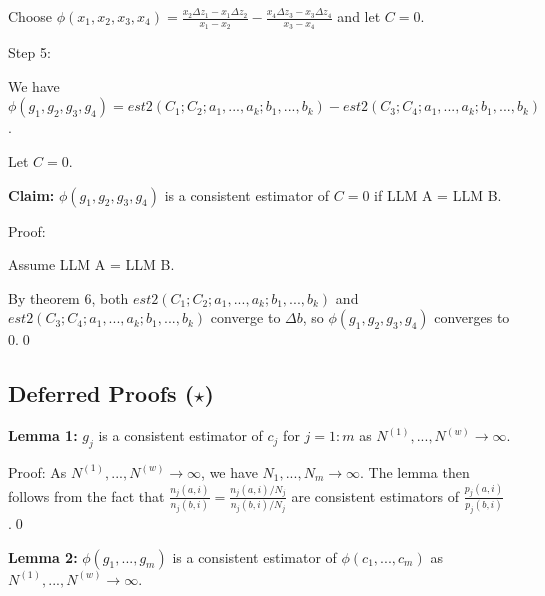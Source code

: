 \documentclass{article}
\begin{document}
Choose $\displaystyle \phi \left( x_{1} ,x_{2} ,x_{3} ,x_{4}\right) =\frac{x_{2} \Delta z_{1} -x_{1} \Delta z_{2}}{x_{1} -x_{2}} -\frac{x_{4} \Delta z_{3} -x_{3} \Delta z_{4}}{x_{3} -x_{4}}$ and let $\displaystyle C=0$.



Step 5:

We have $\displaystyle \phi \left( g_{1} ,g_{2} ,g_{3} ,g_{4}\right) =est2\left( C_{1} ;C_{2} ;a_{1} ,...,a_{k} ;b_{1} ,...,b_{k}\right) -est2\left( C_{3} ;C_{4} ;a_{1} ,...,a_{k} ;b_{1} ,...,b_{k}\right)$.

Let $\displaystyle C=0$.



\textbf{Claim:} $\displaystyle \phi \left( g_{1} ,g_{2} ,g_{3} ,g_{4}\right)$ is a consistent estimator of $\displaystyle C=0$ if LLM A = LLM B.



Proof:

Assume LLM A = LLM B.

By theorem 6, both $\displaystyle est2\left( C_{1} ;C_{2} ;a_{1} ,...,a_{k} ;b_{1} ,...,b_{k}\right)$ and $\displaystyle est2\left( C_{3} ;C_{4} ;a_{1} ,...,a_{k} ;b_{1} ,...,b_{k}\right)$ converge to $\displaystyle \Delta b$, so $\displaystyle \phi \left( g_{1} ,g_{2} ,g_{3} ,g_{4}\right)$ converges to 0.\qed 



\subsection{Deferred Proofs ($\star$)}



\textbf{Lemma 1:} $\displaystyle g_{j}$ is a consistent estimator of $\displaystyle c_{j}$ for $\displaystyle j=1:m$ as $\displaystyle N^{\left( 1\right)} ,...,N^{\left( w\right)}\rightarrow \infty $.



Proof: As $\displaystyle N^{\left( 1\right)} ,...,N^{\left( w\right)}\rightarrow \infty $, we have $\displaystyle N_{1} ,...,N_{m}\rightarrow \infty $. The lemma then follows from the fact that $\displaystyle \frac{n_{j}\left( a,i\right)}{n_{j}\left( b,i\right)} =\frac{n_{j}\left( a,i\right) /N_{j}}{n_{j}\left( b,i\right) /N_{j}}$ are consistent estimators of $\displaystyle \frac{p_{j}\left( a,i\right)}{p_{j}\left( b,i\right)}$.\qed 



\textbf{Lemma 2:} $\displaystyle \phi \left( g_{1} ,...,g_{m}\right)$ is a consistent estimator of $\displaystyle \phi \left( c_{1} ,...,c_{m}\right)$ as $\displaystyle N^{\left( 1\right)} ,...,N^{\left( w\right)}\rightarrow \infty $.
\end{document}
